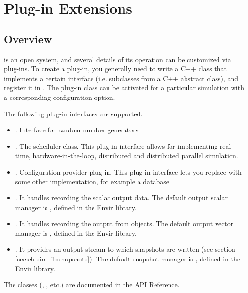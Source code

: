 \chapter{Plug-in Extensions}
\label{cha:plugin-exts}

\section{Overview}

{\opp} is an open system, and several details of its operation
can be customized via plug-ins. To create a plug-in, you generally
need to write a C++ class that implements a certain interface
(i.e. subclasses from a C++ abstract class), and register it in {\opp}.
The plug-in class can be activated for a particular simulation
with a corresponding configuration option.

The following plug-in interfaces are supported:

\begin{itemize}
   \item{. Interface for random number generators.}
   \item{. The scheduler class. This plug-in interface
     allows for implementing real-time, hardware-in-the-loop, distributed
     and distributed parallel simulation.}
   \item{. Configuration provider plug-in.
     This plug-in interface lets you replace 
     with some other implementation, for example a database.}
   \item{. It handles recording the scalar output data.
     The default output scalar manager is ,
     defined in the Envir library.}
   \item{. It handles recording the output
     from  objects. The default output vector manager is
     , defined in the Envir library.}
   \item{. It provides an output stream to which
     snapshots are written (see section \ref{sec:ch-sim-lib:snapshots}).
     The default snapshot manager is ,
     defined in the Envir library.}
\end{itemize}

\label{sec:ch-plugin-exts:customization}

The classes (, , etc.) are documented in
the API Reference.

